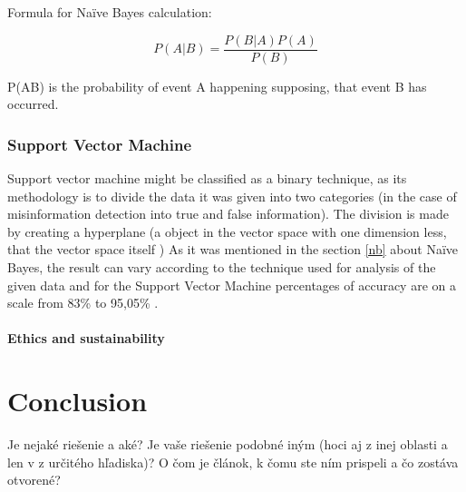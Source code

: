 \documentclass[11pt ,english,a4paper]{article}
\begin{document}
Formula for Naïve Bayes calculation: \cite{sha20mach}

\begin{equation}
P(A|B) = \frac{P(B|A)P(A)}{P(B)}
\end{equation}

P(A\textbar B) is the probability of event A happening supposing, that event B has occurred.

\subsubsection{Support Vector Machine}\label{svm}
Support vector machine might be classified as a binary technique, as its methodology is to divide the data it was given into two categories \cite{pod19mach} (in the case of misinformation detection into true and false information). The division is made by creating a hyperplane (a object in the vector space with one dimension less, that the vector space itself \cite{sha20mach})
As it was mentioned in the section \ref{nb} about Naïve Bayes, the result can vary according to the technique used for analysis of the given data and for the Support Vector Machine percentages of accuracy are on a scale from 83\% \cite{chap22unmask} to 95,05\% \cite{sha20mach}.

\paragraph{Ethics and sustainability}%

\section{Conclusion}\label{conclusion}

Je nejaké riešenie a aké?
Je vaše riešenie podobné iným (hoci aj z inej oblasti a len v z určitého hľadiska)?
O čom je článok, k čomu ste ním prispeli a čo zostáva otvorené?


\newpage

\end{document}
